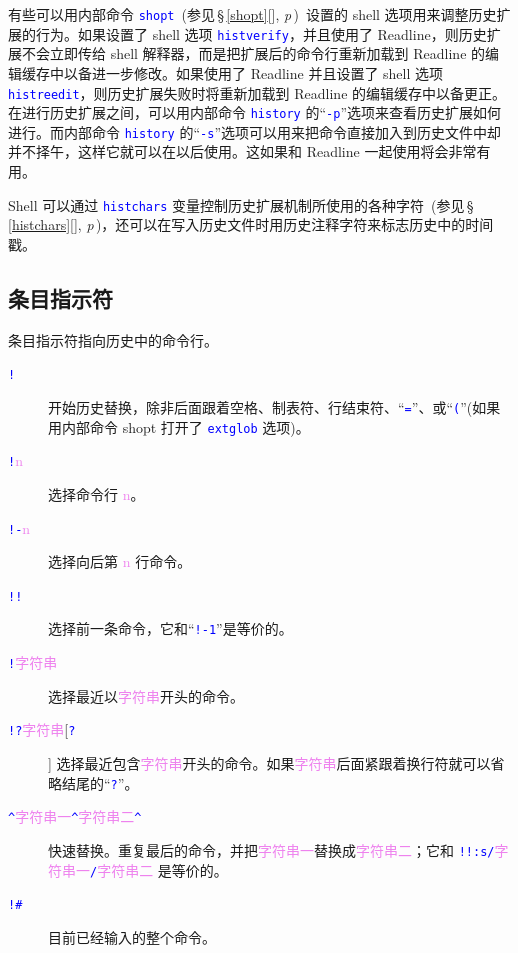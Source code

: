 \documentclass[openany,notitlepage]{book}
\newcommand{\code}[1]{\textcolor{blue}{{\tt #1}}}
\newcommand{\hs}[1]{{\textcolor{violet}{#1}}}
\newcommand{\fullref}[1]{\,\S\,\ref{#1}[\nameref{#1}], \textit{p\pageref{#1}}\,}
\begin{document}
\begin{CJK}{UTF8}{song}
有些可以用内部命令 \code{shopt}~(参见\fullref{shopt})~设置的 shell 选项用来调整历史扩展的行为。如果设置了 shell 选项 \code{histverify}，并且使用了 Readline，则历史扩展不会立即传给 shell 解释器，而是把扩展后的命令行重新加载到 Readline 的编辑缓存中以备进一步修改。如果使用了 Readline 并且设置了 shell 选项 \code{histreedit}，则历史扩展失败时将重新加载到 Readline 的编辑缓存中以备更正。在进行历史扩展之间，可以用内部命令 \code{history} 的``\code{-p}''选项来查看历史扩展如何进行。而内部命令 \code{history} 的``\code{-s}''选项可以用来把命令直接加入到历史文件中却并不择午，这样它就可以在以后使用。这如果和 Readline 一起使用将会非常有用。

Shell 可以通过 \code{histchars} 变量控制历史扩展机制所使用的各种字符~(参见\fullref{histchars})，还可以在写入历史文件时用历史注释字符来标志历史中的时间戳。

\subsection{条目指示符} %
条目指示符指向历史中的命令行。
\begin{description}
    \item[\code{!}] 开始历史替换，除非后面跟着空格、制表符、行结束符、``\code{=}''、或``\code{(}''(如果用内部命令 shopt 打开了 \code{extglob} 选项)。
    \item[\code{!}\hs{n}] 选择命令行 \hs{n}。
    \item[\code{!-}\hs{n}] 选择向后第 \hs{n} 行命令。
    \item[\code{!!}] 选择前一条命令，它和``\code{!-1}''是等价的。
    \item[\code{!}\hs{字符串}] 选择最近以\hs{字符串}开头的命令。
    \item[\code{!?}\hs{字符串}[\code{?}]] 选择最近包含\hs{字符串}开头的命令。如果\hs{字符串}后面紧跟着换行符就可以省略结尾的``\code{?}''。
    \item[\code{\textasciicircum}\hs{字符串一}\code{\textasciicircum}\hs{字符串二}\code{\textasciicircum}] 快速替换。重复最后的命令，并把\hs{字符串一}替换成\hs{字符串二}；它和 \code{!!:s/}\hs{字符串一}\code{/}\hs{字符串二} 是等价的。
    \item[\code{!\#}] 目前已经输入的整个命令。
\end{description}


\end{CJK}
\end{document}
